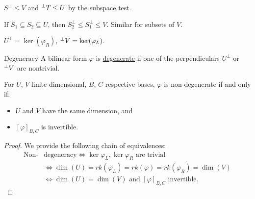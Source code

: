 \documentclass[../Main.tex]{subfiles}
\begin{document}
\begin{remarks}
    \item $S^\perp \leq V$ and ${}^\perp {T} \leq U$ by the subspace test.
    \item If $S_1 \subseteq S_2 \subseteq U$, then $S_2^\perp \leq S_1^\perp \leq V$. Similar for subsets of $V$.
    \item $U^\perp = \ker(\varphi_R)$, ${}^\perp {V} = \ker(\varphi_L)$.
\end{remarks}
\begin{definition}{Degeneracy}
    A bilinear form $\varphi$ is \underline{degenerate} if one of the perpendiculars $U^\perp$ or ${}^\perp {V}$ are nontrivial.
\end{definition}
\begin{proposition}
    For $U$, $V$ finite-dimensional, $B$, $C$ respective bases, $\varphi$ is non-degenerate if and only if:
    \begin{itemize}
        \item $U$ and $V$ have the same dimension, and
        \item $[\varphi]_{B, C}$ is invertible.
    \end{itemize}
    \label{propDegeneracyConditions}
\end{proposition}
\begin{proof}
    We provide the following chain of equivalences:
    \begin{align*}
        \text{Non-}&\text{degeneracy} \iff \ker{\varphi_L}, \ker{\varphi_R} \text{ are trivial} \\
        &\iff \dim(U) = rk(\varphi_L) = rk(\varphi) = rk(\varphi_R) = \dim(V) \\
        &\iff \dim(U) = \dim(V) \text{ and } [\varphi]_{B, C} \text{ invertible.}
    \end{align*}
\end{proof}
\end{document}
